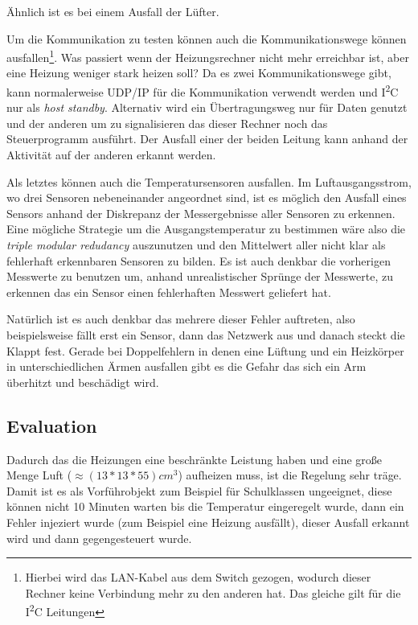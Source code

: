 {\"{A}}hnlich ist es bei einem Ausfall der L{\"{u}}fter. 

Um die Kommunikation zu testen k{\"{o}}nnen auch die Kommunikationswege k{\"{o}}nnen ausfallen\footnote{Hierbei
wird das LAN-Kabel aus dem Switch gezogen, wodurch dieser Rechner keine Verbindung mehr zu den anderen hat.
Das gleiche gilt f{\"{u}}r die I\textsuperscript{2}C Leitungen}.
Was passiert wenn der Heizungsrechner nicht mehr erreichbar ist, aber eine Heizung weniger stark heizen soll?
Da es zwei Kommunikationswege gibt, kann normalerweise UDP/IP f{\"{u}}r die Kommunikation verwendt werden
und I\textsuperscript{2}C nur als \textit{host standby}. Alternativ wird ein {\"{U}}bertragungsweg nur
f{\"{u}}r Daten genutzt und der anderen um zu signalisieren das dieser Rechner noch das
Steuerprogramm ausf{\"{u}}hrt. Der Ausfall einer der beiden Leitung kann anhand der Aktivit{\"{a}}t auf der
anderen erkannt werden.

Als letztes k{\"{o}}nnen auch die Temperatursensoren ausfallen. Im Luftausgangsstrom, wo drei Sensoren nebeneinander angeordnet sind, ist es m{\"{o}}glich den
Ausfall eines Sensors anhand der Diskrepanz der Messergebnisse aller Sensoren zu erkennen. Eine m{\"{o}}gliche Strategie um die Ausgangstemperatur zu
bestimmen w{\"{a}}re also die \textit{triple modular redudancy} auszunutzen und den Mittelwert aller nicht klar als fehlerhaft erkennbaren Sensoren zu bilden.
Es ist auch denkbar die vorherigen Messwerte zu benutzen um, anhand unrealistischer Spr{\"{u}}nge der Messwerte, zu erkennen das ein Sensor einen fehlerhaften
Messwert geliefert hat.

Nat{\"{u}}rlich ist es auch denkbar das mehrere dieser Fehler auftreten, also beispielsweise f{\"{a}}llt
erst ein Sensor, dann das Netzwerk aus und danach steckt die Klappt fest.
Gerade bei Doppelfehlern in denen eine L{\"{u}}ftung und ein Heizk{\"{o}}rper in unterschiedlichen {\"{A}}rmen 
ausfallen gibt es die Gefahr das sich ein Arm {\"{u}}berhitzt und besch{\"{a}}digt wird.

\subsection{Evaluation} Dadurch das die Heizungen eine beschr{\"{a}}nkte Leistung haben und eine gro{\ss}e Menge Luft ($ \approx (13*13*55)cm^3$) aufheizen muss,
ist die Regelung sehr tr{\"{a}}ge. Damit ist es als Vorf{\"{u}}hrobjekt zum Beispiel f{\"{u}}r Schulklassen ungeeignet, diese k{\"{o}}nnen nicht 10 Minuten warten
bis die Temperatur eingeregelt wurde, dann ein Fehler injeziert wurde (zum Beispiel eine Heizung ausf{\"{a}}llt), dieser Ausfall erkannt wird und dann gegengesteuert
wurde.

